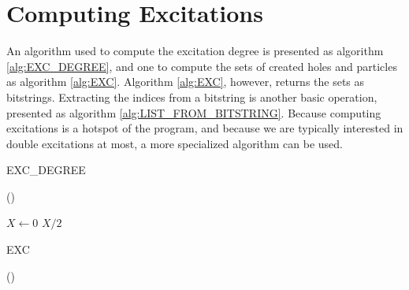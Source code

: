 \documentclass[./thesis.tex]{subfiles}
\begin{document}
\section{Computing Excitations}
\label{sec:det_exc}

An algorithm used to compute the excitation degree is presented as algorithm \ref{alg:EXC_DEGREE}, and one to compute the sets of created holes and particles as algorithm \ref{alg:EXC}. Algorithm \ref{alg:EXC}, however, returns the sets as bitstrings. Extracting the indices from a bitstring is another basic operation, presented as algorithm \ref{alg:LIST_FROM_BITSTRING}.
Because computing excitations is a hotspot of the program, and because we are typically interested in double excitations at most, a more specialized algorithm can be used.\cite{Scemama_2013}


\begin{algorithm}[h!]
	\caption{EXC\_DEGREE}
	\label{alg:EXC_DEGREE}
	
	\Fn(){}{

		$X \gets 0$   \;
		\KwRet $X / 2$\;
	}
\end{algorithm}


\begin{algorithm}[H]
	\caption{EXC}
		
	\label{alg:EXC}
	
	\Fn(){}{
		\;
		}
\end{algorithm}
\end{document}
